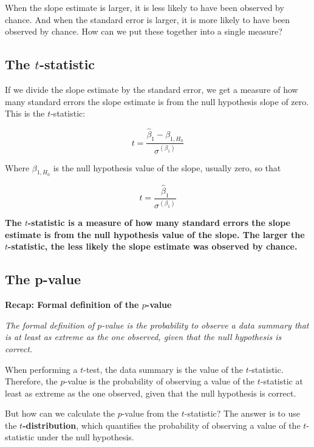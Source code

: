 \documentclass[
  letterpaper,
  8pt,
  a4paper]{book}
\begin{document}
When the slope estimate is larger, it is less likely to have been
observed by chance. And when the standard error is larger, it is more
likely to have been observed by chance. How can we put these together
into a single measure?

\subsection*{\texorpdfstring{The
\(t\)-statistic}{The t-statistic}}\label{the-t-statistic}

If we divide the slope estimate by the standard error, we get a measure
of how many standard errors the slope estimate is from the null
hypothesis slope of zero. This is the \(t\)-statistic:

\[t = \frac{\hat\beta_1 - \beta_{1,H_0}}{\sigma^{(\beta_1)}}\]

Where \(\beta_{1,H_0}\) is the null hypothesis value of the slope,
usually zero, so that

\[t = \frac{\hat\beta_1}{\sigma^{(\beta_1)}}\]

\textbf{The \(t\)-statistic is a measure of how many standard errors the
slope estimate is from the null hypothesis value of the slope. The
larger the \(t\)-statistic, the less likely the slope estimate was
observed by chance.}

\subsection*{The p-value}\label{the-p-value}

\textbf{Recap: Formal definition of the \(p\)-value}

\emph{The formal definition of \(p\)-value is the probability to observe
a data summary that is at least as extreme as the one observed, given
that the null hypothesis is correct.}

When performing a \(t\)-test, the data summary is the value of the
\(t\)-statistic. Therefore, the \(p\)-value is the probability of
observing a value of the \(t\)-statistic at least as extreme as the one
observed, given that the null hypothesis is correct.

But how can we calculate the \(p\)-value from the \(t\)-statistic? The
answer is to use the \textbf{\(t\)-distribution}, which quantifies the
probability of observing a value of the \(t\)-statistic under the null
hypothesis.
\end{document}
